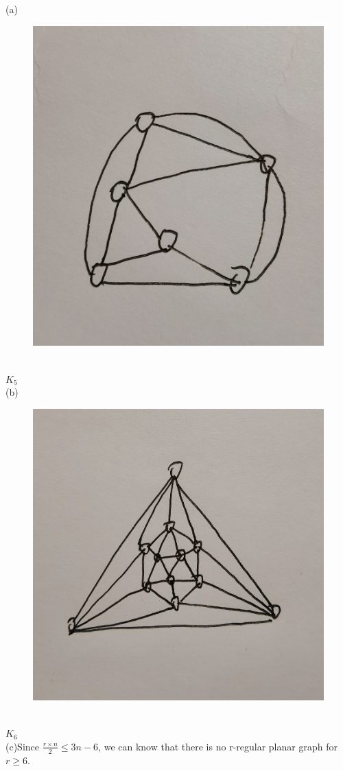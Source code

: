 \documentclass[a4paper, justified]{tufte-handout}
\begin{document}
\begin{solution}
  (a)
  \begin{figure}[htbp]
    \centering
    \includegraphics[width = 0.30\linewidth]{figs/a}
  \end{figure}
  \\
  $K_5$\\
  (b)
  \begin{figure}[htbp]
    \centering
    \includegraphics[width = 0.30\linewidth]{figs/b}
  \end{figure}
  \\
  $K_6$\\
  (c)Since $\frac{r\times n}{2} \leq 3n-6$, we can know that there is no r-regular planar graph for $r\geq 6$.
\end{solution}

\begin{problem}[CZ 9.7]

\end{problem}
\end{document}
